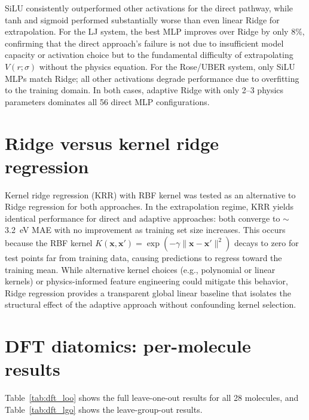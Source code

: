 \documentclass[aps,prb,twocolumn,superscriptaddress,longbibliography,floatfix]{revtex4-2}
\begin{document}
SiLU consistently outperformed other activations for the direct pathway, while tanh and sigmoid performed substantially worse than even linear Ridge for extrapolation. For the LJ system, the best MLP improves over Ridge by only 8\%, confirming that the direct approach's failure is not due to insufficient model capacity or activation choice but to the fundamental difficulty of extrapolating $V(r;\sigma)$ without the physics equation. For the Rose/UBER system, only SiLU MLPs match Ridge; all other activations degrade performance due to overfitting to the training domain. In both cases, adaptive Ridge with only 2--3 physics parameters dominates all 56 direct MLP configurations.


\section{Ridge versus kernel ridge regression}
\label{app:krr}

Kernel ridge regression (KRR) with RBF kernel was tested as an alternative to Ridge regression for both approaches. In the extrapolation regime, KRR yields identical performance for direct and adaptive approaches: both converge to $\sim$3.2~eV MAE with no improvement as training set size increases. This occurs because the RBF kernel $K(\mathbf{x}, \mathbf{x}') = \exp(-\gamma\|\mathbf{x} - \mathbf{x}'\|^2)$ decays to zero for test points far from training data, causing predictions to regress toward the training mean. While alternative kernel choices (e.g., polynomial or linear kernels) or physics-informed feature engineering could mitigate this behavior, Ridge regression provides a transparent global linear baseline that isolates the structural effect of the adaptive approach without confounding kernel selection.


\section{DFT diatomics: per-molecule results}
\label{app:dft_details}

Table~\ref{tab:dft_loo} shows the full leave-one-out results for all 28 molecules, and Table~\ref{tab:dft_lgo} shows the leave-group-out results.
\end{document}
